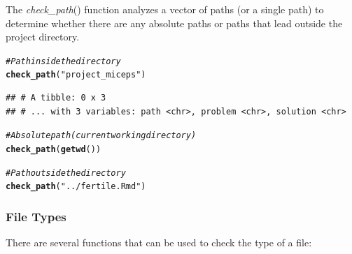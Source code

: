 \documentclass[APA,LATO1COL]{WileyNJD-v2}\usepackage[]{graphicx}\usepackage[]{color}
\makeatletter
\newcommand{\hlstr}[1]{\textcolor[rgb]{0.192,0.494,0.8}{#1}}%
\newcommand{\hlcom}[1]{\textcolor[rgb]{0.678,0.584,0.686}{\textit{#1}}}%
\newcommand{\hlstd}[1]{\textcolor[rgb]{0.345,0.345,0.345}{#1}}%
\newcommand{\hlkwd}[1]{\textcolor[rgb]{0.737,0.353,0.396}{\textbf{#1}}}%
\newenvironment{kframe}{%
 \def\at@end@of@kframe{}%
 \ifinner\ifhmode%
  \def\at@end@of@kframe{\end{minipage}}%
  \begin{minipage}{\columnwidth}%
 \fi\fi%
 \def\FrameCommand##1{\hskip\@totalleftmargin \hskip-\fboxsep
 \colorbox{shadecolor}{##1}\hskip-\fboxsep
     \hskip-\linewidth \hskip-\@totalleftmargin \hskip\columnwidth}%
 \MakeFramed {\advance\hsize-\width
   \@totalleftmargin\z@ \linewidth\hsize
   \@setminipage}}%
 {\par\unskip\endMakeFramed%
 \at@end@of@kframe}
\newenvironment{knitrout}{}{} %
\newcommand{\func}[1]{\textit{#1}()}
\makeatother
\begin{document}
The \func{check\_path} function analyzes a vector of paths (or a single path) to determine whether there are any absolute paths or paths that lead outside the project directory.

\begin{knitrout}
\color{fgcolor}\begin{kframe}
\begin{alltt}
\hlcom{# Path inside the directory}
\hlkwd{check_path}\hlstd{(}\hlstr{"project_miceps"}\hlstd{)}
\end{alltt}
\begin{verbatim}
## # A tibble: 0 x 3
## # ... with 3 variables: path <chr>, problem <chr>, solution <chr>
\end{verbatim}
\begin{alltt}
\hlcom{# Absolute path (current working directory)}
\hlkwd{check_path}\hlstd{(}\hlkwd{getwd}\hlstd{())}
\end{alltt}


{\ttfamily\noindent\bfseries\color{errorcolor}{\#\# Error: Detected absolute paths}}\begin{alltt}
\hlcom{# Path outside the directory}
\hlkwd{check_path}\hlstd{(}\hlstr{"../fertile.Rmd"}\hlstd{)}
\end{alltt}


{\ttfamily\noindent\bfseries\color{errorcolor}{\#\# Error: Detected paths that lead outside the project directory}}\end{kframe}
\end{knitrout}

\subsubsection{File Types}

There are several functions that can be used to check the type of a file: 
\end{document}

